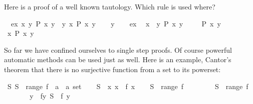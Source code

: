 \begin{isabellebody}
\begin{isamarkuptext}
Here is a proof of a well known tautology.
Which rule is used where?%
\end{isamarkuptext}%
\isamarkuptrue%
\ \ ex{\isacharcolon}\ {\isachardoublequote}{\isasymexists}x{\isachardot}\ {\isasymforall}y{\isachardot}\ P\ x\ y{\isachardoublequote}\ \ {\isachardoublequote}{\isasymforall}y{\isachardot}\ {\isasymexists}x{\isachardot}\ P\ x\ y{\isachardoublequote}\isanewline
\isamarkupfalse%
\isanewline
\ \ \isamarkupfalse%
\ y\isanewline
\ \ \isamarkupfalse%
\ ex\ \isamarkupfalse%
\ x\ \ {\isachardoublequote}{\isasymforall}y{\isachardot}\ P\ x\ y{\isachardoublequote}\ \isamarkupfalse%
\isacommand{{\isachardot}{\isachardot}}\isanewline
\ \ \isamarkupfalse%
\ {\isachardoublequote}P\ x\ y{\isachardoublequote}\ \isamarkupfalse%
\isacommand{{\isachardot}{\isachardot}}\isanewline
\ \ \isamarkupfalse%
\ {\isachardoublequote}{\isasymexists}x{\isachardot}\ P\ x\ y{\isachardoublequote}\ \isamarkupfalse%
\isacommand{{\isachardot}{\isachardot}}\isanewline
\isamarkupfalse%
\isamarkupfalse%
%
\isamarkuptrue%
%
\begin{isamarkuptext}%
So far we have confined ourselves to single step proofs. Of course
powerful automatic methods can be used just as well. Here is an example,
Cantor's theorem that there is no surjective function from a set to its
powerset:%
\end{isamarkuptext}%
\isamarkuptrue%
\ {\isachardoublequote}{\isasymexists}S{\isachardot}\ S\ {\isasymnotin}\ range\ {\isacharparenleft}f\ {\isacharcolon}{\isacharcolon}\ {\isacharprime}a\ {\isasymRightarrow}\ {\isacharprime}a\ set{\isacharparenright}{\isachardoublequote}\isanewline
\isamarkupfalse%
\isanewline
\ \ \isamarkupfalse%
\ {\isacharquery}S\ {\isacharequal}\ {\isachardoublequote}{\isacharbraceleft}x{\isachardot}\ x\ {\isasymnotin}\ f\ x{\isacharbraceright}{\isachardoublequote}\isanewline
\ \ \isamarkupfalse%
\ {\isachardoublequote}{\isacharquery}S\ {\isasymnotin}\ range\ f{\isachardoublequote}\isanewline
\ \ \isamarkupfalse%
\isanewline
\ \ \ \ \isamarkupfalse%
\ {\isachardoublequote}{\isacharquery}S\ {\isasymin}\ range\ f{\isachardoublequote}\isanewline
\ \ \ \ \isamarkupfalse%
\ \isamarkupfalse%
\ y\ \ fy{\isacharcolon}\ {\isachardoublequote}{\isacharquery}S\ {\isacharequal}\ f\ y{\isachardoublequote}\ \isamarkupfalse%

\end{isabellebody}
